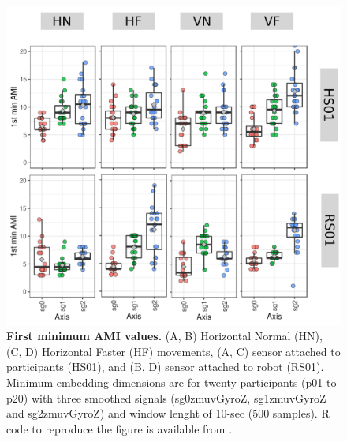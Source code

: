 \begin{figure}
\centering
\includegraphics[width=1.0\textwidth]{AMI}
	\caption{
	{\bf First minimum AMI values.} 
		(A, B) Horizontal Normal (HN), (C, D) Horizontal Faster (HF) 
		movements,
		(A, C) sensor attached to participants (HS01), and
		(B, D) sensor attached to robot (RS01).
		Minimum embedding dimensions are for twenty participants 
		(p01 to p20) with three smoothed signals 
		(sg0zmuvGyroZ, sg1zmuvGyroZ and sg2zmuvGyroZ)
		and window lenght of 10-sec (500 samples).
		R code to reproduce the figure is available 
		from \cite{hwum2018}.
        }
    \label{fig:AMI}
\end{figure}



\newpage
